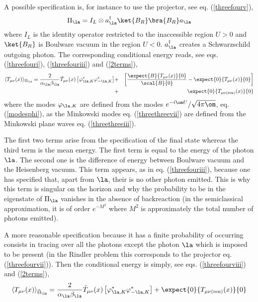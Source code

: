 \documentclass[12pt]{article}
\begin{document}
A possible specification is,
for instance to use the projector, see eq. (\ref{threefourv}),
\begin{equation}
\Pi_{\la} =  I_{L} \otimes
a^\dagger_{\la}  \ket{B_R}\bra{B_{R}} a_{\la}
 \label{threefourva} \end{equation}
where $I_{{L }}$ is the identity operator restricted to the
inaccessible region $U>0$
and $\ket{B_R}$ is Boulware vacuum in the region $U<0$.
$a^\dagger_\la$ creates a Schwarzschild outgoing photon.
The corresponding conditional energy
reads, see eqs. (\ref{threefouri}), (\ref{threefouriii}) and (\ref{2terms}),
\begin{eqnarray}
\langle T_{\mu \nu} (x) \rangle_{\Pi_{\la}} =
{2 \over \alpha_\la \beta_\la } \hat T_{\mu \nu }(x)
\left[ \varphi^*_{\la,K} \varphi^*_{-\la,K} \right]
 &+& \left[ {
\expect{B} {T_{\mu \nu } (x)} {0} \over  \scal{B}{0}}
- \expect{0}{T_{\mu \nu} (x)}{0} \right]
\nonumber
\\
&+&\expect{0}{T_{\mu \nu
({\rm ren})} (x)}{0}
\label{bh18}
\end{eqnarray}
where the modes $\varphi_{\la,K}$ are defined from the
modes $e^{-i\om U}/\sqrt{4 \pi \om}$, eq. (\ref{modesphi}), as the Minkowski
modes
eq. (\ref{threethreevii}) are defined from the Minkowski plane waves
eq. (\ref{threethreeiii}).

The first two terms arise from the specification of the final state whereas the
third
term is the mean energy.
The first term is equal to the energy of the photon $\la$. The second
one is
the difference of energy between Boulware vacuum and the
Heisenberg vacuum.
This term appears,
as in eq. (\ref{threefouriii}),
because one has specified that, apart from $\la$, their is no other photon
emitted. This is why this term is singular on the horizon
and why
the probability to be in the eigenstate of $\Pi_{\la}$
 vanishes in the absence of backreaction
(in the semiclassical approximation, it is of  order
 $e^{-M^2}$ where $M^2$ is approximately
the total number of photons emitted).

A more reasonable specification because it has a finite probability
of occurring consists in tracing over all the photons
except the photon $\la$ which is imposed to be present (in the Rindler
problem this corresponds to the projector eq. (\ref{threefourvii})).
 Then the conditional energy is
simply, see eqs. (\ref{threefourviii}) and (\ref{2terms}),
\begin{equation}
\langle T_{\mu \nu }(x)\rangle _{\tilde \Pi_\la} =
{2 \over \alpha_\la \beta_\la } \hat T_{\mu
\nu } (x)
\left[ \varphi^*_{\la,K} \varphi^*_{-\la,K} \right]+ \expect{0}{T_{\mu
\nu
({\rm ren})} (x)}{0}
\label{bh19}
\end{equation}
\end{document}

